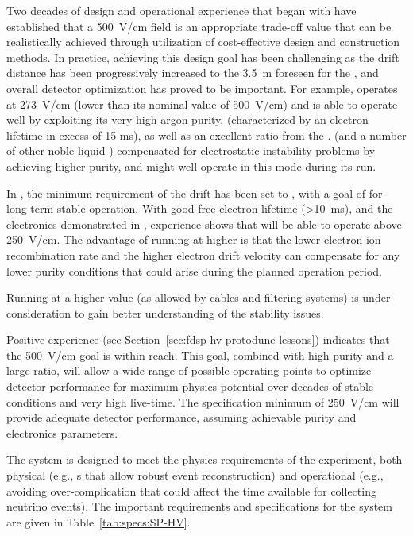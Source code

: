 Two decades of design and operational experience that began with  have established that a \SI{500}{V/cm} field is an appropriate trade-off value that can be realistically achieved through utilization of cost-effective design and construction methods. In practice, achieving this design goal has been challenging as the drift distance has been progressively increased to the 
\SI{3.5}{m} foreseen for the , and overall detector optimization has proved to be important. For example,  operates  at \SI{273}{V/cm} (lower than its nominal value of \SI{500}{V/cm}) and is able to operate well by exploiting its very high argon purity, (characterized by an electron lifetime in excess of 15 ms), as well as an excellent  ratio from the  .  
 (and a number of other noble liquid ) compensated for electrostatic instability problems by achieving higher purity, and  might well operate in this mode during its run. 

In , the minimum requirement of the drift \efield has been set to \mindriftfield, with a goal 
of \mindriftfieldgoal for long-term stable operation. With good free electron lifetime (>\SI{10}{ms}), and the electronics  demonstrated in , experience shows that  will be able to operate above \SI{250}{V/cm}. The advantage of running at higher \efield is that the lower electron-ion recombination rate and the higher electron drift velocity can compensate for any lower purity conditions that could arise during the planned operation period.

 Running  at a higher  value (as allowed by  cables and filtering systems) is under consideration to gain better understanding of the  stability issues.

Positive  experience (see  Section~\ref{sec:fdsp-hv-protodune-lessons}) indicates that the \SI{500}{V/cm} \efield goal is within reach. This goal, combined with high  purity and a large  ratio, will allow  a wide range of possible operating points to optimize detector performance for maximum physics potential over decades of stable conditions and very high live-time. 
The specification minimum of \SI{250}{V/cm} will provide adequate detector performance, assuming achievable purity and electronics parameters. 

The  system is designed to meet the physics requirements of the  experiment,  both physical  (e.g., \efield{}s that allow robust event reconstruction) and operational (e.g., avoiding over-complication that could affect 
the time available for collecting neutrino events). 
The important requirements and specifications for the  system are given in Table~\ref{tab:specs:SP-HV}. 

